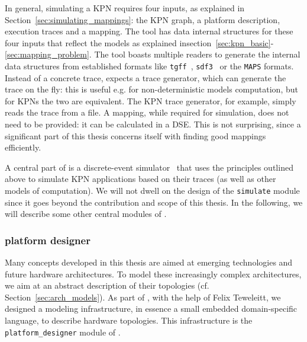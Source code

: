 In general, simulating a KPN requires four inputs, as explained in Section~\ref{sec:simulating_mappings}: the \ac{KPN} graph, a platform description, execution traces and a mapping.
The \mocasin tool has data internal structures for these four inputs that reflect the models as explained insection~\ref{sec:kpn_basic}-\ref{sec:mapping_problem}.
The tool boasts multiple readers to generate the internal data structures from established formats like \texttt{tgff}~\cite{dick1998tgff}, \texttt{sdf3}~\cite{sdf3} or the \texttt{MAPS} formats. \index{\acs*{\SDFFF}}
Instead of a concrete trace, \mocasin expects a trace generator, which can generate the trace on the fly: this is useful e.g. for non-deterministic models computation, but for KPNs the two are equivalent.
The \ac{KPN} trace generator, for example, simply reads the trace from a file.
A mapping, while required for simulation, does not need to be provided: it can be calculated in a \acl{DSE}.
This is not surprising, since a significant part of this thesis concerns itself with finding good mappings efficiently.

A central part of \mocasin is a discrete-event simulator~\cite{menard_norcas16} that uses the principles outlined above to simulate KPN applications based on their traces (as well as other models of computation).
We will not dwell on the design of the \texttt{simulate} module since it goes beyond the contribution and scope of this thesis.
In the following, we will describe some other central modules of \mocasin. 


\subsubsection{platform designer}

Many concepts developed in this thesis are aimed at emerging technologies and future hardware architectures.
To model these increasingly complex architectures, we aim at an abstract description of their topologies (cf. Section~\ref{sec:arch_models}).
As part of \mocasin, with the help of Felix Teweleitt, we designed a modeling infrastructure, in essence a small embedded domain-specific language, to describe hardware topologies.
This infrastructure is the \texttt{platform\_designer} module of \mocasin.

